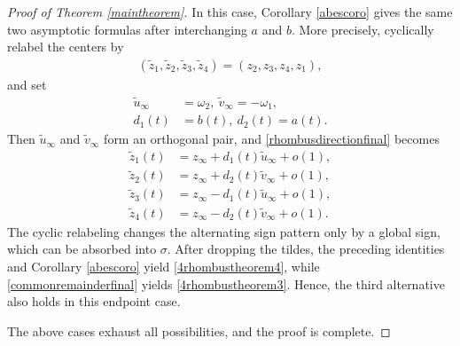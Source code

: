 \documentclass[10pt,a4paper]{amsart}
\numberwithin{equation}{section}
\begin{document}
\begin{proof}[Proof of Theorem \ref{maintheorem}]
In this case, Corollary \ref{abescoro} gives the same two asymptotic formulas after interchanging $a$ and $b$. More precisely, cyclically relabel the centers by
\begin{align*}
(\tilde{z}_1,\tilde{z}_2,\tilde{z}_3,\tilde{z}_4)=(z_2,z_3,z_4,z_1),
\end{align*}
and set
\begin{align*}
\tilde{u}_{\infty}&=\omega_2,\ \tilde{v}_{\infty}=-\omega_1,
\\
d_1(t)&=b(t),\ d_2(t)=a(t).
\end{align*}
Then $\tilde{u}_{\infty}$ and $\tilde{v}_{\infty}$ form an orthogonal pair, and \eqref{rhombusdirectionfinal} becomes
\begin{align*}
\tilde{z}_1(t)
&=z_{\infty}
+d_1(t)\tilde{u}_{\infty}+o(1),
\\
\tilde{z}_2(t)
&=z_{\infty}
+d_2(t)\tilde{v}_{\infty}+o(1),
\\
\tilde{z}_3(t)
&=z_{\infty}
-d_1(t)\tilde{u}_{\infty}+o(1),
\\
\tilde{z}_4(t)
&=z_{\infty}
-d_2(t)\tilde{v}_{\infty}+o(1).
\end{align*}
The cyclic relabeling changes the alternating sign pattern only by a global sign, which can be absorbed into $\sigma$. After dropping the tildes, the preceding identities and Corollary \ref{abescoro} yield \eqref{4rhombustheorem4}, while
\eqref{commonremainderfinal} yields \eqref{4rhombustheorem3}. Hence, the third alternative also holds
in this endpoint case.

The above cases exhaust all possibilities, and the proof is complete.

\end{proof}
\end{document}
